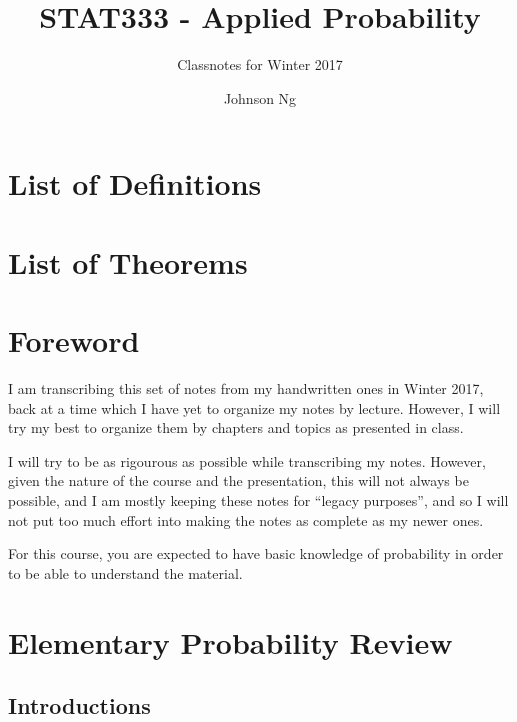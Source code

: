 \documentclass[notoc,notitlepage]{tufte-book}
\title{STAT333 - Applied Probability}
\author{Johnson Ng}
\subtitle{Classnotes for Winter 2017}
\begin{document}
\hypersetup{pageanchor=false}
\maketitle
\hypersetup{pageanchor=true}
\tableofcontents

\chapter*{\faBook \enspace List of Definitions}

\chapter*{\faCoffee \enspace List of Theorems}

\chapter*{Foreword}%
\label{chp:foreword}

\begin{fullwidth}
  I am transcribing this set of notes from my handwritten ones in Winter 2017, back at a time which I have yet to organize my notes by lecture. However, I will try my best to organize them by chapters and topics as presented in class.

  I will try to be as rigourous as possible while transcribing my notes. However, given the nature of the course and the presentation, this will not always be possible, and I am mostly keeping these notes for ``legacy purposes'', and so I will not put too much effort into making the notes as complete as my newer ones.

  For this course, you are expected to have basic knowledge of probability in order to be able to understand the material.
\end{fullwidth}


\chapter{Elementary Probability Review}%
\label{chp:elementary_probability_review}

\section{Introductions}%
\label{sec:introductions}
\end{document}
